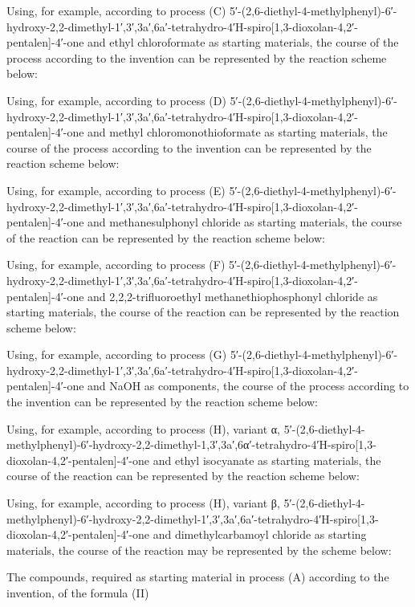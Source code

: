 \documentclass[11pt,a4paper]{article}
\begin{document}
Using, for example, according to process (C) 5′-(2,6-diethyl-4-methylphenyl)-6′-hydroxy-2,2-dimethyl-1′,3′,3a′,6a′-tetrahydro-4′H-spiro[1,3-dioxolan-4,2′-pentalen]-4′-one and ethyl chloroformate as starting materials, the course of the process according to the invention can be represented by the reaction scheme below:

Using, for example, according to process (D) 5′-(2,6-diethyl-4-methylphenyl)-6′-hydroxy-2,2-dimethyl-1′,3′,3a′,6a′-tetrahydro-4′H-spiro[1,3-dioxolan-4,2′-pentalen]-4′-one and methyl chloromonothioformate as starting materials, the course of the process according to the invention can be represented by the reaction scheme below:

Using, for example, according to process (E) 5′-(2,6-diethyl-4-methylphenyl)-6′-hydroxy-2,2-dimethyl-1′,3′,3a′,6a′-tetrahydro-4′H-spiro[1,3-dioxolan-4,2′-pentalen]-4′-one and methanesulphonyl chloride as starting materials, the course of the reaction can be represented by the reaction scheme below:

Using, for example, according to process (F) 5′-(2,6-diethyl-4-methylphenyl)-6′-hydroxy-2,2-dimethyl-1′,3′,3a′,6a′-tetrahydro-4′H-spiro[1,3-dioxolan-4,2′-pentalen]-4′-one and 2,2,2-trifluoroethyl methanethiophosphonyl chloride as starting materials, the course of the reaction can be represented by the reaction scheme below:

Using, for example, according to process (G) 5′-(2,6-diethyl-4-methylphenyl)-6′-hydroxy-2,2-dimethyl-1′,3′,3a′,6a′-tetrahydro-4′H-spiro[1,3-dioxolan-4,2′-pentalen]-4′-one and NaOH as components, the course of the process according to the invention can be represented by the reaction scheme below:

Using, for example, according to process (H), variant α, 5′-(2,6-diethyl-4-methylphenyl)-6′-hydroxy-2,2-dimethyl-1,3′,3a′,6α′-tetrahydro-4′H-spiro[1,3-dioxolan-4,2′-pentalen]-4′-one and ethyl isocyanate as starting materials, the course of the reaction can be represented by the reaction scheme below:

Using, for example, according to process (H), variant β, 5′-(2,6-diethyl-4-methylphenyl)-6′-hydroxy-2,2-dimethyl-1′,3′,3a′,6a′-tetrahydro-4′H-spiro[1,3-dioxolan-4,2′-pentalen]-4′-one and dimethylcarbamoyl chloride as starting materials, the course of the reaction may be represented by the scheme below:

The compounds, required as starting material in process (A) according to the invention, of the formula (II)
\end{document}

